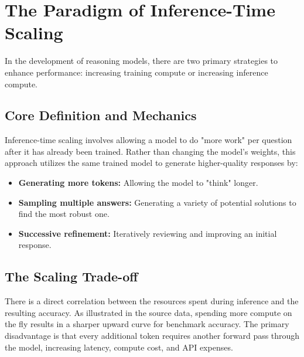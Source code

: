 ﻿\section{The Paradigm of Inference-Time Scaling}
\label{sec:approach}


In the development of reasoning models, there are two primary strategies to enhance performance: increasing training compute or increasing inference compute.

\subsection{Core Definition and Mechanics}

Inference-time scaling involves allowing a model to do "more work" per question after it has already been trained. Rather than changing the model's weights, this approach utilizes the same trained model to generate higher-quality responses by:

\begin{itemize}
    \item \textbf{Generating more tokens:} Allowing the model to "think" longer.
    \item \textbf{Sampling multiple answers:} Generating a variety of potential solutions to find the most robust one.
    \item \textbf{Successive refinement:} Iteratively reviewing and improving an initial response.
\end{itemize}

\subsection{The Scaling Trade-off}

There is a direct correlation between the resources spent during inference and the resulting accuracy. As illustrated in the source data, spending more compute on the fly results in a sharper upward curve for benchmark accuracy. The primary disadvantage is that every additional token requires another forward pass through the model, increasing latency, compute cost, and API expenses.